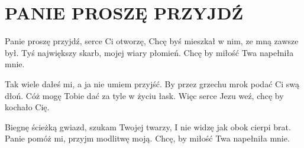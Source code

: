 \documentclass[../../../songbook.tex]{subfiles}
\begin{document}
\TabPositions{8cm} %
\section*{PANIE PROSZĘ PRZYJDŹ}
{}
\vspace{0.5cm}
Panie proszę przyjdź, serce Ci otworzę,		 \newline
Chcę byś mieszkał w nim, ze mną zawsze był.	 \newline
Tyś największy skarb, mojej wiary płomień.	 \newline
Chcę by miłość Twa napełniła mnie.			 \newline

\-\hspace{1cm}Tak wiele dałeś mi, a ja nie umiem przyjść.	 \newline
\-\hspace{1cm}By przez grzechu mrok podać Ci swą dłoń.	 \newline
\-\hspace{1cm}Cóż mogę Tobie dać za tyle w życiu łask.	 \newline
\-\hspace{1cm}Więc serce Jezu weź, chcę by kochało Cię.	 \newline

Biegnę ścieżką gwiazd, szukam Twojej twarzy,	\newline
I nie widzę jak obok cierpi brat.           	\newline   
Panie pomóż mi, przyjm modlitwę moją.           \newline
Chcę, by miłość Twa napełniła mnie.  			\newline
\end{document}
